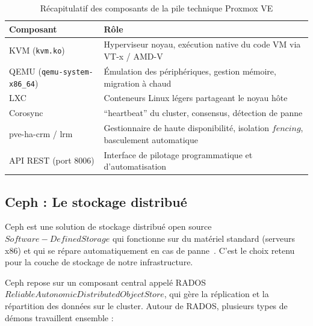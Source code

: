 \begin{table}[H]
\centering
\caption{Récapitulatif des composants de la pile technique Proxmox VE}
\label{tab:pile-proxmox}
\begin{tabular}{|p{4.5cm}|p{8cm}|}
\hline
\textbf{Composant} & \textbf{Rôle} \\
\hline
KVM (\texttt{kvm.ko}) & Hyperviseur noyau, exécution native du code VM via VT-x / AMD-V \\
\hline
QEMU (\texttt{qemu-system-x86\_64}) & Émulation des périphériques, gestion mémoire, migration à chaud \\
\hline
LXC & Conteneurs Linux légers partageant le noyau hôte \\
\hline
Corosync & ``heartbeat'' du cluster, consensus, détection de panne \\
\hline
pve-ha-crm / lrm & Gestionnaire de haute disponibilité, isolation \(fencing\), basculement automatique \\
\hline
API REST (port 8006) & Interface de pilotage programmatique et d'automatisation \\
\hline
\end{tabular}
\end{table}

\subsection{Ceph : Le stockage distribué}

\par Ceph est une solution de stockage distribué open source \(Software-Defined Storage\) qui fonctionne sur du matériel standard (serveurs x86) et qui se répare automatiquement en cas de panne~\cite{ref27}. C'est le choix retenu pour la couche de stockage de notre infrastructure.\\


\par Ceph repose sur un composant central appelé RADOS \(Reliable Autonomic Distributed Object Store\), qui gère la réplication et la répartition des données sur le cluster. Autour de RADOS, plusieurs types de démons travaillent ensemble :\\

